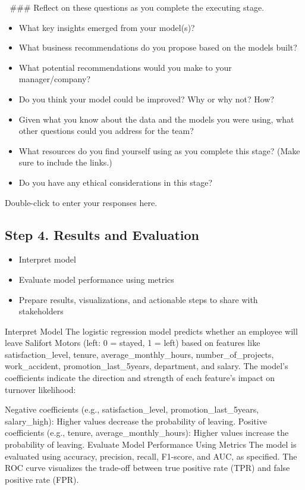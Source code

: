 \documentclass[11pt]{article}
\providecommand{\tightlist}{%
      \setlength{\itemsep}{0pt}\setlength{\parskip}{0pt}}
\begin{document}
    💭 \#\#\# Reflect on these questions as you complete the executing stage.

\begin{itemize}
\tightlist
\item
  What key insights emerged from your model(s)?
\item
  What business recommendations do you propose based on the models
  built?
\item
  What potential recommendations would you make to your manager/company?
\item
  Do you think your model could be improved? Why or why not? How?
\item
  Given what you know about the data and the models you were using, what
  other questions could you address for the team?
\item
  What resources do you find yourself using as you complete this stage?
  (Make sure to include the links.)
\item
  Do you have any ethical considerations in this stage?
\end{itemize}

    Double-click to enter your responses here.

    \hypertarget{step-4.-results-and-evaluation}{%
\subsection{Step 4. Results and
Evaluation}\label{step-4.-results-and-evaluation}}

\begin{itemize}
\tightlist
\item
  Interpret model
\item
  Evaluate model performance using metrics
\item
  Prepare results, visualizations, and actionable steps to share with
  stakeholders
\end{itemize}

Interpret Model The logistic regression model predicts whether an
employee will leave Salifort Motors (left: 0 = stayed, 1 = left) based
on features like satisfaction\_level, tenure, average\_monthly\_hours,
number\_of\_projects, work\_accident, promotion\_last\_5years,
department, and salary. The model's coefficients indicate the direction
and strength of each feature's impact on turnover likelihood:

Negative coefficients (e.g., satisfaction\_level,
promotion\_last\_5years, salary\_high): Higher values decrease the
probability of leaving. Positive coefficients (e.g., tenure,
average\_monthly\_hours): Higher values increase the probability of
leaving. Evaluate Model Performance Using Metrics The model is evaluated
using accuracy, precision, recall, F1-score, and AUC, as specified. The
ROC curve visualizes the trade-off between true positive rate (TPR) and
false positive rate (FPR).
\end{document}
